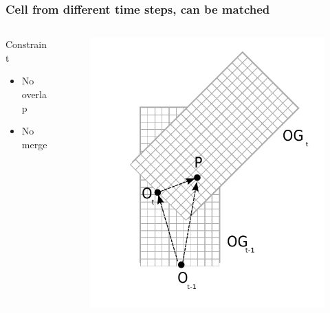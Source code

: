 \documentclass{beamer}
\begin{document}
	\begin{frame}
		\frametitle{Cell from different time steps, can be matched}

		  \begin{columns}[t]
		  \begin{column}{5cm}
			\begin{alertblock}{Constraint}
				\begin{itemize}
				\item No overlap
				\item No merge
				\end{itemize}
			\end{alertblock}
		  \end{column}
		  
		  \begin{column}{5cm}
			\begin{figure}[h]
			\center
			\includegraphics[scale=0.5]{../img/fig:translation}
			\end{figure}	
		  \end{column}
		 \end{columns}		 

	\end{frame}
\end{document}
